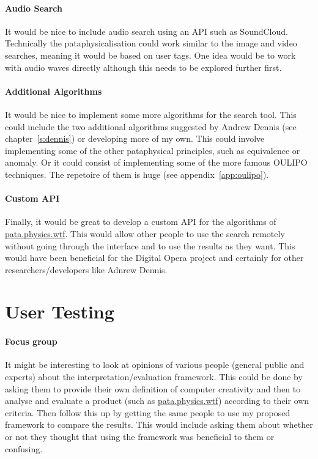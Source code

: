 \paragraph{Audio Search} 
It would be nice to include audio search using an \ac{API} such as SoundCloud. Technically the pataphysicalisation could work similar to the image and video searches, meaning it would be based on user tags. One idea would be to work with audio waves directly although this needs to be explored further first.

\paragraph{Additional Algorithms} 
It would be nice to implement some more algorithms for the search tool. This could include the two additional algorithms suggested by Andrew Dennis (see chapter~\ref{s:dennis}) or developing more of my own. This could involve implementing some of the other pataphysical principles, such as equivalence or anomaly. Or it could consist of implementing some of the more famous \ac{OULIPO} techniques. The repetoire of them is huge (see appendix~\ref{app:oulipo}).

\paragraph{Custom API}
Finally, it would be great to develop a custom \ac{API} for the algorithms of \url{pata.physics.wtf}. This would allow other people to use the search remotely without going through the interface and to use the results as they want. This would have been beneficial for the Digital Opera project and certainly for other researchers/developers like Adnrew Dennis.


\section{User Testing}

\paragraph{Focus group}
It might be interesting to look at opinions of various people (general public and experts) about the interpretation/evaluation framework. This could be done by asking them to provide their own definition of computer creativity and then to analyse and evaluate a product (such as \url{pata.physics.wtf}) according to their own criteria. Then follow this up by getting the same people to use my proposed framework to compare the results. This would include asking them about whether or not they thought that using the framework was beneficial to them or confusing.

